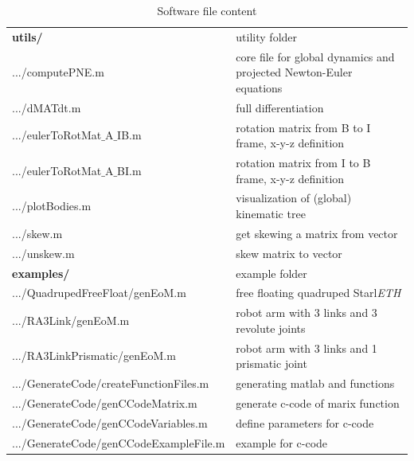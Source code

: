 \begin{table}
\begin{tabular}[width=1\textwidth]{|p{6cm} p{7cm}|}
\hline
\footnotesize \bf{utils/} &\footnotesize utility folder\\
\footnotesize.../computePNE.m & \footnotesize core file for global dynamics and projected Newton-Euler equations\\
\footnotesize.../dMATdt.m & \footnotesize full differentiation \\
\footnotesize.../eulerToRotMat$\_$A$\_$IB.m &\footnotesize rotation matrix from B to I frame, x-y-z definition \\
\footnotesize.../eulerToRotMat$\_$A$\_$BI.m &\footnotesize rotation matrix from I to B frame, x-y-z definition \\
\footnotesize.../plotBodies.m &\footnotesize visualization of (global) kinematic tree \\
\footnotesize.../skew.m &\footnotesize get skewing a matrix from vector \\
\footnotesize.../unskew.m &\footnotesize skew matrix to vector \\
\hline
\footnotesize\bf{examples/} &\footnotesize example folder\\
\footnotesize.../QuadrupedFreeFloat/genEoM.m &\footnotesize free floating quadruped Starl\textit{ETH} \\
\footnotesize.../RA3Link/genEoM.m &\footnotesize robot arm with 3 links and 3 revolute joints\\
\footnotesize.../RA3LinkPrismatic/genEoM.m &\footnotesize robot arm with 3 links and 1 prismatic joint \\
\footnotesize.../GenerateCode/createFunctionFiles.m &\footnotesize generating matlab and functions \\
\footnotesize.../GenerateCode/genCCodeMatrix.m &\footnotesize generate c-code of marix function \\
\footnotesize.../GenerateCode/genCCodeVariables.m &\footnotesize define parameters for c-code \\
\footnotesize.../GenerateCode/genCCodeExampleFile.m &\footnotesize example for c-code \\
\hline
\end{tabular}
\label{tab:content}
\caption{Software file content}
\end{table}
\normalsize
 \cleardoublepage



 \setcounter{tocdepth}{2}
 \tableofcontents
 
 \cleardoublepage
